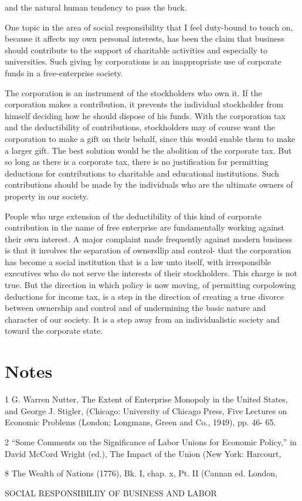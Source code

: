 \documentclass[11pt,openany]{book}
\newcommand{\booknoteshead}{%
  \phantomsection\section*{Notes}%
  \addcontentsline{toc}{section}{Notes}\markright{Notes}}
\begin{document}
and the natural human tendency to pass the buck.

One topic in the area of social responsibility that I feel duty-bound to touch on, because it affects my own personal interests, has been the claim that business should contribute to the support of charitable activities and especially to universities. Such giving by corporations is an inappropriate use of corporate funds in a free-enterprise society.

The corporation is an instrument of the stockholders who own it. If the corporation makes a contribution, it prevents the individual stockholder from himself deciding how he should dispose of his funds. With the corporation tax and the deductibility of contributions, stockholders may of course want the corporation to make a gift on their behalf, since this would enable them to make a larger gift. The best solution would be the abolition of the corporate tax. But so long as there is a corporate tax, there is no justification for permitting deductions for contributions to charitable and educational institutions. Such contributions should be made by the individuals who are the ultimate owners of property in our society.

People who urge extension of the deductibility of this kind of corporate contribution in the name of free enterprise are fundamentally working against their own interest. A major complaint made frequently against modern business is that it involves the separation of ownersllip and control- that the corporation has become a social institution that is a law unto itself, with irresponsible executives who do not serve the interests of their stockholders. This charge is not true. But the direction in which policy is now moving, of permitting corpolowing deductions for income tax, is a step in the direction of creating a true divorce between ownership and control and of undermining the basic nature and character of our society. It is a step away from an individualistic society and toward the corporate state.

\booknoteshead

{\footnotesize\setlength{\parindent}{0pt}\setlength{\parskip}{5pt}

1 G. Warren Nutter, The Extent of Enterprise Monopoly in the United States, and George J. Stigler, (Chicago: University of Chicago Press, Five Lectures on Economic Problems (London; Longmans, Green and Co., 1949), pp. 46- 65.\par

2 ``Some Comments on the Significance of Labor Unions for Economic Policy,'' in David McCord Wright (ed.), The Impact of the Union (New York: Harcourt,\par

8 The Wealth of Nations (1776), Bk. I, chap. x, Pt. II (Cannan ed. London,\par

SOCIAL RESPONSIBILIlY OF BUSINESS AND LABOR\par

}
\end{document}
